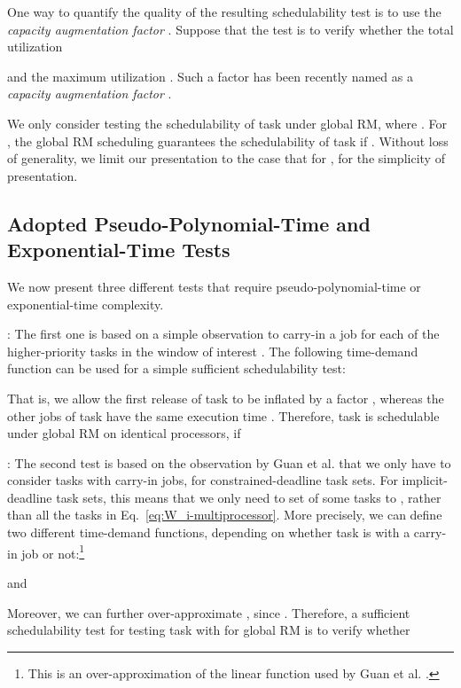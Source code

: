 \documentclass[10pt,conference]{IEEEtran}
\begin{document}
One way to quantify the quality of the resulting schedulability test
is to use the \emph{capacity augmentation factor} \cite{Li:ECRTS14}.
Suppose that the test is to verify whether the total utilization

and the maximum utilization . Such a factor  has
been recently named as a \emph{capacity augmentation factor}
\cite{Li:ECRTS14}. 


We only consider testing the schedulability of task  under
global RM, where . For , the global RM scheduling
guarantees the schedulability of task  if . Without loss of generality, we limit our presentation to the
case that  for
, for the simplicity of presentation.

\subsection{Adopted Pseudo-Polynomial-Time and Exponential-Time Tests}

We now present three different tests that require
pseudo-polynomial-time or exponential-time complexity.

:  The first one is based on a simple observation to carry-in a job for
each of the higher-priority tasks in the window of interest \cite{DBLP:conf/rtss/GuanSYY09}. The
following time-demand function  can be used for a simple
sufficient schedulability test:

That is, we allow the first release of task  to be inflated by
a factor , whereas the other jobs of task  have the same
execution time .  
Therefore, task  is schedulable under global RM on 
identical processors, if
{\small  
}
 
:  
The second test is based on the observation by Guan et
al. \cite{DBLP:conf/rtss/GuanSYY09} that we only have to consider
 tasks with carry-in jobs, for constrained-deadline task sets.
 For implicit-deadline
task sets, this means that we only need to set  of some
tasks to , rather than all the  tasks in
Eq.~\eqref{eq:W_i-multiprocessor}. More precisely, we can define two
different time-demand functions, depending on whether task  is
with a carry-in job or not:\footnote{This is an over-approximation of the linear function used by Guan et al. \cite{DBLP:conf/rtss/GuanSYY09}.}

and

Moreover, we can further over-approximate , since  . Therefore, a sufficient schedulability test for testing task  with  for global RM is to verify whether 
\end{document}
